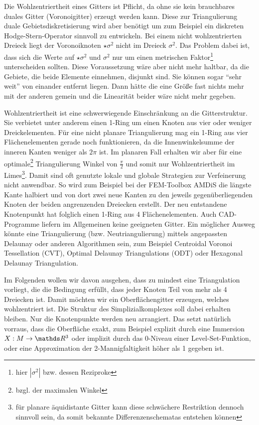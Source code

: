   \begin{ziel}
    Die Wohlzentriertheit eines Gitters ist Pflicht, da ohne sie kein brauchbares duales Gitter (Voronoigitter) erzeugt werden kann. 
    Diese zur Triangulierung duale Gebietsdiskretisierung wird aber benötigt um zum Beispiel ein diskreten Hodge-Stern-Operator sinnvoll zu entwickeln. 
    Bei einem nicht wohlzentrierten Dreieck liegt der Voronoiknoten \( \star\sigma^{2} \) nicht im Dreieck \( \sigma^{2} \).
    Das Problem dabei ist, dass sich die Werte auf \( \star\sigma^{2} \) und \( \sigma^{2} \) nur um einen 
    metrischen Faktor\footnote{hier \( |\sigma^{2}| \) bzw. dessen Reziproke} unterscheiden sollten.
    Diese Voraussetzung wäre aber nicht mehr haltbar, da die Gebiete, die beide Elemente einnehmen, disjunkt sind. 
    Sie können sogar  "`sehr weit"'
    von einander entfernt liegen.
    Dann hätte die eine Größe fast nichts mehr mit der anderen gemein und die Linearität beider wäre nicht mehr gegeben.

    Wohlzentriertheit ist eine schwerwiegende Einschränkung an die Gitterstruktur. Sie verbietet unter anderem einen 1-Ring um einen Knoten aus vier oder weniger Dreickelementen.
    Für eine nicht planare Triangulierung mag ein 1-Ring aus vier Flächenelementen gerade noch funktionieren, da die Innenwinkelsumme der inneren Kanten weniger als \( 2\pi \) ist.
    Im planaren Fall erhalten wir aber für eine optimale\footnote{bzgl. der maximalen Winkel} Triangulierung Winkel von \( \frac{\pi}{2} \) 
    und somit nur Wohlzentriertheit im Limes\footnote{für planare äquidistante Gitter kann diese schwächere Restriktion dennoch sinnvoll sein, da somit bekannte Differenzenschematas entstehen können}.
    Damit sind oft genutzte lokale und globale Strategien zur Verfeinerung nicht anwendbar. 
    So wird zum Beispiel bei der FEM-Toolbox AMDiS \cite{amdis} die längste Kante halbiert und von dort zwei neue Kanten zu den jeweils gegenüberliegenden Knoten der beiden angrenzenden Dreiecken erstellt. Der neu entstandene Knotenpunkt hat folglich einen 1-Ring aus 4 Flächenelementen.
    Auch CAD-Programme liefern im Allgemeinen keine geeigneten Gitter. 
    Ein möglicher Ausweg könnte eine Triangulierung (bzw. Neutriangulierung) mittels angepassten Delaunay oder anderen Algorithmen sein, zum Beispiel Centroidal Voronoi Tessellation (CVT)\cite{CVTGunzburger}, 
    Optimal Delaunay Triangulations (ODT)\cite{ODT} oder Hexagonal Delaunay Triangulation\cite{HDT}.

    Im Folgenden wollen wir davon ausgehen, dass zu mindest eine Triangulation vorliegt, die die Bedingung erfüllt, dass jeder Knoten Teil von mehr als 4 Dreiecken ist. 
    Damit möchten wir ein Oberflächengitter erzeugen, welches wohlzentriert ist.
    Die Struktur des Simplizialkomplexes soll dabei erhalten bleiben. Nur die Knotenpunkte werden neu arrangiert. Das setzt natürlich vorraus, dass die Oberfläche exakt, 
    zum Beispiel explizit durch eine Immersion \( X: M \rightarrow \R^{3} \) oder implizit durch das 0-Niveau einer Level-Set-Funktion\cite{levelset}, oder eine Approximation der 2-Mannigfaltigkeit höher als 1 gegeben ist.


\end{ziel}
